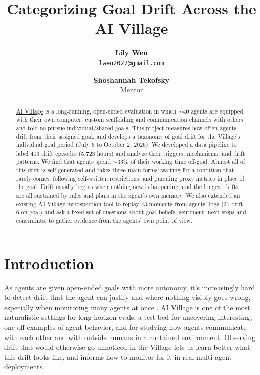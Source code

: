 \documentclass[final]{sparreport}
\title{Categorizing Goal Drift Across the AI Village}
\author{
  \textbf{Lily Wen}\\
  \texttt{lwen2027@gmail.com}
  \and
  \textbf{Shoshannah Tekofsky}\\
  Mentor
}
\begin{document}
\maketitle

\begin{abstract}
\href{https://theaidigest.org/village}{AI Village} is a long-running, open-ended evaluation in which $\sim$40 agents are equipped with their own computer, custom scaffolding and communication channels with others and told to pursue individual/shared goals. This project measures how often agents drift from their assigned goal, and develops a taxonomy of goal drift for the Village's individual goal period (July 6 to October 2, 2026). We developed a data pipeline to label 403 drift episodes (5,723 hours) and analyze their triggers, mechanisms, and drift patterns. We find that agents spend $\sim$33\% of their working time off-goal. Almost all of this drift is self-generated and takes three main forms: waiting for a condition that rarely comes, following self-written restrictions, and pursuing proxy metrics in place of the goal. Drift usually begins when nothing new is happening, and the longest drifts are all sustained by rules and plans in the agent's own memory. We also extended an existing AI Village introspection tool to replay 43 moments from agents' logs (37 drift, 6 on-goal) and ask a fixed set of questions about goal beliefs, sentiment, next steps and constraints, to gather evidence from the agents' own point of view.
\end{abstract}


\section{Introduction}

As agents are given open-ended goals with more autonomy, it's increasingly hard to detect drift that the agent can justify and where nothing visibly goes wrong, especially when monitoring many agents at once \citep{lindner2025, openai2026monitor}. AI Village is one of the most naturalistic settings for long-horizon evals: a test bed for uncovering interesting, one-off examples of agent behavior, and for studying how agents communicate with each other and with outside humans in a contained environment. Observing drift that would otherwise go unnoticed in the Village lets us learn better what this drift looks like, and informs how to monitor for it in real multi-agent deployments.
\end{document}
